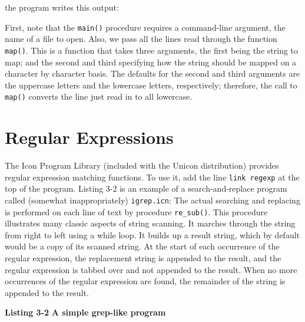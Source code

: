 \noindent the program writes this output: 


First, note that the \texttt{main()} procedure requires a command-line
argument, the name of a file to open. Also, we pass all the lines read
through the function \texttt{map()}. This is a function that takes
three arguments, the first being the string to map; and the second and
third specifying how the string should be mapped on a character by
character basis. The defaults for the second and third arguments are
the uppercase letters and the lowercase letters, respectively;
therefore, the call to \texttt{map()} converts the line just read in to
all lowercase.

\section{Regular Expressions}

The Icon Program Library (included with the Unicon distribution)
provides regular expression matching
functions. To use it, add the line \texttt{link regexp} at the top of
the program. Listing 3-2 is an example of a search-and-replace program
called (somewhat inappropriately)
\texttt{i}\texttt{grep}\texttt{.icn}: The actual searching
and replacing is performed on each line of text by procedure
\texttt{re\_sub()}. This procedure illustrates many classic aspects of
string scanning. It marches through the string from right to left using
a while loop. It builds up a result string, which by default would be a
copy of its scanned string. At the start of each occurrence of the
regular expression, the replacement string is appended to the result,
and the regular expression is tabbed over and not appended to the
result. When no more occurrences of the regular expression are found,
the remainder of the string is appended to the result.

\bigskip

{\sffamily\bfseries Listing 3-2}
{\sffamily\bfseries A simple grep-like program}

